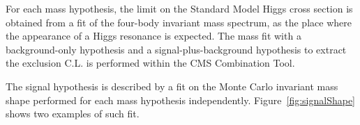 \begin{table}
\begin{center}

 \end{center}
 \caption{List of trigger paths used to select events for this analysis, in the final state with
 electrons (a) and with muons (b).}
 \label{tab:HLT}
\end{table}

For each mass hypothesis, the limit on the Standard Model Higgs cross section is obtained from a fit
of the four-body invariant mass spectrum, as the place where the appearance of a Higgs resonance
is expected. The mass fit with a background-only hypothesis and a signal-plus-background hypothesis
to extract the exclusion C.L. is performed within the CMS Combination Tool.

The signal hypothesis is described by a fit on the Monte Carlo invariant mass shape performed for
each mass hypothesis independently. Figure~\ref{fig:signalShape} shows two examples of such fit.


